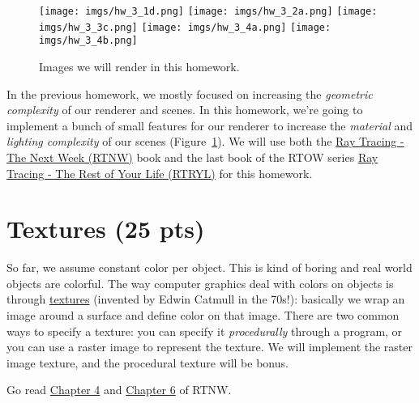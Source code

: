 
\usepackage{xcolor}




\begin{figure}[ht]
    \centering
    \texttt{[image: imgs/hw\_3\_1d.png]}
    \texttt{[image: imgs/hw\_3\_2a.png]}
    \texttt{[image: imgs/hw\_3\_3c.png]}
    \texttt{[image: imgs/hw\_3\_4a.png]}
    \texttt{[image: imgs/hw\_3\_4b.png]}
    \caption{Images we will render in this homework.}
    \label{fig:teaser}
\end{figure}

In the previous homework, we mostly focused on increasing the \emph{geometric complexity} of our renderer and scenes. In this homework, we're going to implement a bunch of small features for our renderer to increase the \emph{material} and \emph{lighting complexity} of our scenes (Figure~\ref{fig:teaser}). We will use both the \href{https://raytracing.github.io/books/RayTracingTheNextWeek.html}{Ray Tracing - The Next Week (RTNW)} book and the last book of the RTOW series \href{https://raytracing.github.io/books/RayTracingTheRestOfYourLife.html}{Ray Tracing - The Rest of Your Life (RTRYL)} for this homework.

\section{Textures (25 pts)}
So far, we assume constant color per object. This is kind of boring and real world objects are {\color{red}c}{\color{orange}o}{\color{green}l}{\color{blue}o}{\color{cyan}r}f{\color{magenta}u}{\color{violet}l}. The way computer graphics deal with colors on objects is through \href{https://en.wikipedia.org/wiki/Texture_mapping}{textures} (invented by Edwin Catmull in the 70s!): basically we wrap an image around a surface and define color on that image. There are two common ways to specify a texture: you can specify it \emph{procedurally} through a program, or you can use a raster image to represent the texture. We will implement the raster image texture, and the procedural texture will be bonus.

Go read \href{https://raytracing.github.io/books/RayTracingTheNextWeek.html#solidtextures}{Chapter 4} and \href{https://raytracing.github.io/books/RayTracingTheNextWeek.html#imagetexturemapping}{Chapter 6} of RTNW.

